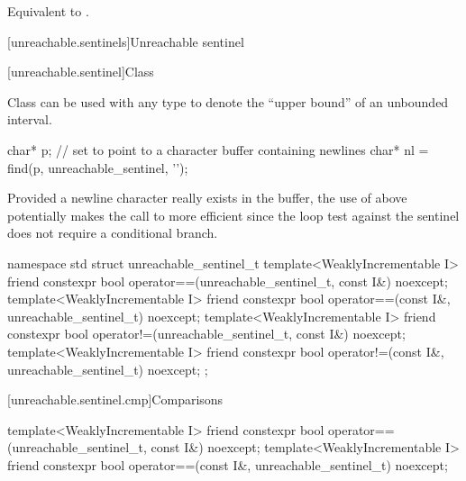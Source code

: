 \begin{itemdescr}
\pnum
\effects Equivalent to .
\end{itemdescr}

[unreachable.sentinels]{Unreachable sentinel}

[unreachable.sentinel]{Class }

%
\pnum
Class  can be used with
any  type
to denote the ``upper bound'' of an unbounded interval.

\pnum
\begin{example}
\begin{codeblock}
char* p;
// set  to point to a character buffer containing newlines
char* nl = find(p, unreachable_sentinel, '\n');
\end{codeblock}

Provided a newline character really exists in the buffer, the use of
 above potentially makes the call to  more
efficient since the loop test against the sentinel does not require a
conditional branch.
\end{example}

\begin{codeblock}
namespace std {
  struct unreachable_sentinel_t {
    template<WeaklyIncrementable I>
      friend constexpr bool operator==(unreachable_sentinel_t, const I&) noexcept;
    template<WeaklyIncrementable I>
      friend constexpr bool operator==(const I&, unreachable_sentinel_t) noexcept;
    template<WeaklyIncrementable I>
      friend constexpr bool operator!=(unreachable_sentinel_t, const I&) noexcept;
    template<WeaklyIncrementable I>
      friend constexpr bool operator!=(const I&, unreachable_sentinel_t) noexcept;
  };
}
\end{codeblock}

[unreachable.sentinel.cmp]{Comparisons}

%
%
\begin{itemdecl}
template<WeaklyIncrementable I>
  friend constexpr bool operator==(unreachable_sentinel_t, const I&) noexcept;
template<WeaklyIncrementable I>
  friend constexpr bool operator==(const I&, unreachable_sentinel_t) noexcept;
\end{itemdecl}

